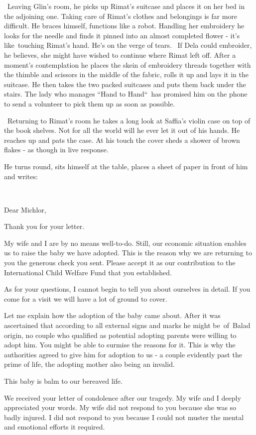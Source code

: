 \documentclass[twoside,11pt]{book}
\begin{document}
\ Leaving Glin's room, he picks up Rimat's suitcase and places it on her bed in the adjoining one. Taking care of
Rimat's clothes and belongings is far more difficult. He braces himself, functions like a robot. Handling her
embroidery he looks for the needle and finds it pinned into an almost completed flower - it's like~touching Rimat's
hand. He's on the verge of tears{.} \ If Dela could embroider, he believes, she
might have wished to continue where Rimat left off. After a moment's contemplation he places the skein of embroidery
threads together with the thimble and scissors in the middle of the fabric, rolls it up and lays it in the suitcase. He
then takes the two packed suitcases and puts them back under the stairs. The lady who manages ``Hand to
Hand``~has promised him on the phone to send a volunteer to pick them up as soon as possible.

\ Returning to Rimat's room he takes a long look at Saffia's violin case on top of the book shelves. Not for
all{ }the world will he ever let it out of his hands. He reaches up and pats
the case. At his touch the cover sheds a shower of brown flakes - as though in live response.

He turns round, sits himself at the table, places a sheet of paper in front of him and writes:

~

Dear Michlor,

Thank you for your letter.

My wife and I are by no means well-to-do. Still, our economic situation enables us to raise the baby we have adopted.
This is the reason why we are returning to you the generous check you sent. Please accept it as our contribution to the
International Child Welfare Fund that you established.

As for your questions, I cannot begin to tell you about ourselves in detail. If you come for a visit we will have a lot
of ground to cover.

Let me explain how the adoption of the baby came about. After it was ascertained that according to all external signs
and marks he might be~of~Balad origin, no couple who qualified as potential adopting parents were willing to adopt him.
You might be able to surmise the reasons for it. This is why the authorities agreed to give him for adoption to us - a
couple evidently past the prime of life, the adopting mother also being an invalid.

This baby is balm to our bereaved life.

We received your letter of condolence after our tragedy. My wife and I deeply appreciated your words. My wife did not
respond to you because she was so badly injured. I did not respond to you because I could not muster the mental and
emotional efforts it required.
\end{document}
